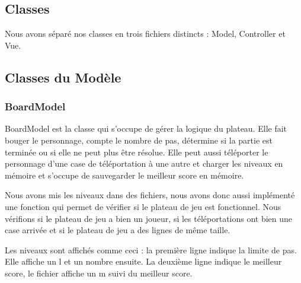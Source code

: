 \documentclass[utf8]{article}
\begin{document}
\begin{large}
\par


\section{Classes}
\indent
\par
Nous avons séparé nos classes en trois fichiers distincts : Model, Controller et Vue.
\par
\subsection{Classes du Modèle}

\subsubsection{BoardModel}
\indent
\par
BoardModel est la classe qui s'occupe de gérer la logique du plateau. Elle fait
bouger le personnage, compte le nombre de pas, détermine si la partie est
terminée ou si elle ne peut plus être résolue. Elle peut aussi téléporter le
personnage d'une case de téléportation à une autre et charger les niveaux en
mémoire et s'occupe de sauvegarder le meilleur score en mémoire.
\par
\indent
\par
Nous avons mis les niveaux dans des fichiers, nous avons donc aussi implémenté
une fonction qui permet de vérifier si le plateau de jeu est fonctionnel. Nous
vérifions si le plateau de jeu a bien un joueur, si les téléportations ont bien une
case arrivée et si le plateau de jeu a des lignes de même taille.
\par
Les niveaux sont affichés comme ceci : la première ligne indique la limite de
pas. Elle affiche un l et un nombre ensuite. La deuxième ligne indique le
meilleur score, le fichier affiche un m suivi du meilleur score.
\par


\end{large}
\end{document}
